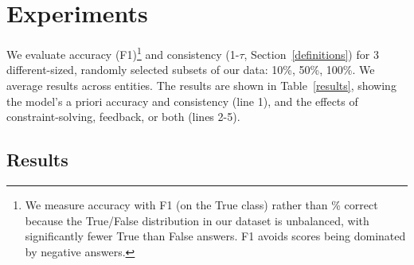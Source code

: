 \documentclass[11pt]{article}
\begin{document}
\section{Experiments}

We evaluate accuracy (F1)\footnote{
We measure accuracy with F1 (on the True class) rather than \% correct because
the True/False distribution in our dataset is unbalanced, with significantly fewer True than False
answers. F1 avoids scores being dominated by negative answers.}
and consistency (1-$\tau$, Section~\ref{definitions}) 
for 3 different-sized, randomly selected subsets of our data: 10\%, 50\%, 100\%. We average results across entities.
The results are shown in Table~\ref{results},
showing the model's a priori accuracy and consistency (line 1),
and the effects of constraint-solving, feedback, or both (lines 2-5).

\subsection{Results}
\end{document}
